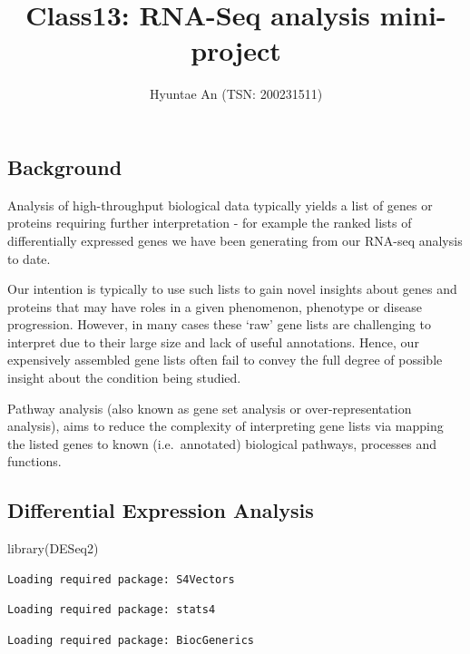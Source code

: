 \documentclass[
  letterpaper,
  DIV=11,
  numbers=noendperiod]{scrartcl}
\title{Class13: RNA-Seq analysis mini-project}
\author{Hyuntae An (TSN: 200231511)}
\date{}
\newenvironment{Shaded}{\begin{snugshade}}{\end{snugshade}}
\newcommand{\FunctionTok}[1]{\textcolor[rgb]{0.28,0.35,0.67}{#1}}
\newcommand{\NormalTok}[1]{\textcolor[rgb]{0.00,0.23,0.31}{#1}}
\begin{document}
\maketitle


\subsection{Background}\label{background}

Analysis of high-throughput biological data typically yields a list of
genes or proteins requiring further interpretation - for example the
ranked lists of differentially expressed genes we have been generating
from our RNA-seq analysis to date.

Our intention is typically to use such lists to gain novel insights
about genes and proteins that may have roles in a given phenomenon,
phenotype or disease progression. However, in many cases these `raw'
gene lists are challenging to interpret due to their large size and lack
of useful annotations. Hence, our expensively assembled gene lists often
fail to convey the full degree of possible insight about the condition
being studied.

Pathway analysis (also known as gene set analysis or over-representation
analysis), aims to reduce the complexity of interpreting gene lists via
mapping the listed genes to known (i.e.~annotated) biological pathways,
processes and functions.

\subsection{Differential Expression
Analysis}\label{differential-expression-analysis}

\begin{Shaded}
\begin{Highlighting}[]
\FunctionTok{library}\NormalTok{(DESeq2)}
\end{Highlighting}
\end{Shaded}

\begin{verbatim}
Loading required package: S4Vectors
\end{verbatim}

\begin{verbatim}
Loading required package: stats4
\end{verbatim}

\begin{verbatim}
Loading required package: BiocGenerics
\end{verbatim}
\end{document}
